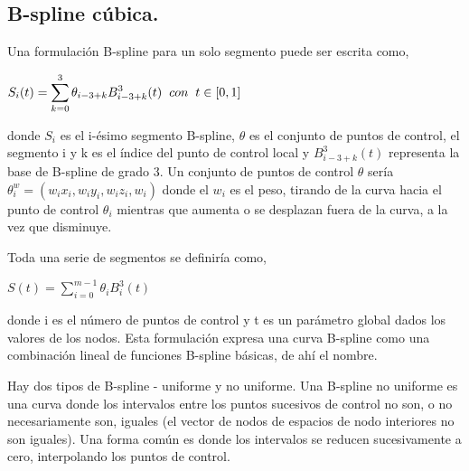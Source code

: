 \subsection{B-spline c\'ubica.\\}

\hspace{0.4cm} Una formulaci\'on B-spline para un solo segmento puede ser escrita como,

\vspace{0.2cm}

\begin{center}
$\displaystyle{S_{i}(t) = \sum_{k=0}^{3} \theta_{i-3+k} B_{i-3+k}^{3}(t) \hspace{0.2cm} con \hspace{0.2cm} t \in [0,1]  }$
\end{center}

\vspace{0.2cm}

\noindent donde $S_{i}$ es el i-\'esimo segmento B-spline, $\theta$ es el conjunto de puntos de control, el segmento i y k es el \'indice del punto de control local y $ B_{i-3+k}^{3}(t)$ representa la base de B-spline de grado 3. Un conjunto de puntos de control $\theta$ ser\'ia  ${\displaystyle \theta_{i}^{w}=(w_{i}x_{i},w_{i}y_{i},w_{i}z_{i},w_{i})}$ donde el ${\displaystyle w_{i}}$ es el peso, tirando de la curva hacia el punto de control ${\displaystyle \theta_{i}}$ mientras que aumenta o se desplazan fuera de la curva, a la vez que disminuye.

\newpage

\hspace{0.4cm} Toda una serie de segmentos se definir\'ia como,

\begin{center}
$\displaystyle{S(t) = \sum_{i=0}^{m-1} \theta_{i} B_{i}^{3}(t)  }$
\end{center}

\noindent donde i es el n\'umero de puntos de control y t es un par\'ametro global dados los valores de los nodos. Esta formulaci\'on expresa una curva B-spline como una combinaci\'on lineal de funciones B-spline b\'asicas, de ah\'i el nombre.

\hspace{0.4cm} Hay dos tipos de B-spline - uniforme y no uniforme. Una B-spline no uniforme es una curva donde los intervalos entre los puntos sucesivos de control no son, o no necesariamente son, iguales (el vector de nodos de espacios de nodo interiores no son iguales). Una forma com\'un es donde los intervalos se reducen sucesivamente a cero, interpolando los puntos de control.


